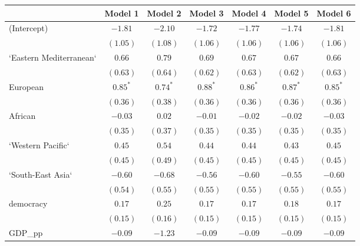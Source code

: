 
\begin{table}[!h]
\begin{center}
\begin{tabular}{l c c c c c c }
\toprule
 & Model 1 & Model 2 & Model 3 & Model 4 & Model 5 & Model 6 \\
\midrule
(Intercept)             & $-1.81$      & $-2.10$      & $-1.72$      & $-1.77$      & $-1.74$      & $-1.81$      \\
                        & $(1.05)$     & $(1.08)$     & $(1.06)$     & $(1.06)$     & $(1.06)$     & $(1.06)$     \\
`Eastern Mediterranean` & $0.66$       & $0.79$       & $0.69$       & $0.67$       & $0.67$       & $0.66$       \\
                        & $(0.63)$     & $(0.64)$     & $(0.62)$     & $(0.63)$     & $(0.62)$     & $(0.63)$     \\
European                & $0.85^{*}$   & $0.74^{*}$   & $0.88^{*}$   & $0.86^{*}$   & $0.87^{*}$   & $0.85^{*}$   \\
                        & $(0.36)$     & $(0.38)$     & $(0.36)$     & $(0.36)$     & $(0.36)$     & $(0.36)$     \\
African                 & $-0.03$      & $0.02$       & $-0.01$      & $-0.02$      & $-0.02$      & $-0.03$      \\
                        & $(0.35)$     & $(0.37)$     & $(0.35)$     & $(0.35)$     & $(0.35)$     & $(0.35)$     \\
`Western Pacific`       & $0.45$       & $0.54$       & $0.44$       & $0.44$       & $0.43$       & $0.45$       \\
                        & $(0.45)$     & $(0.49)$     & $(0.45)$     & $(0.45)$     & $(0.45)$     & $(0.45)$     \\
`South-East Asia`       & $-0.60$      & $-0.68$      & $-0.56$      & $-0.60$      & $-0.55$      & $-0.60$      \\
                        & $(0.54)$     & $(0.55)$     & $(0.55)$     & $(0.55)$     & $(0.55)$     & $(0.55)$     \\
democracy               & $0.17$       & $0.25$       & $0.17$       & $0.17$       & $0.18$       & $0.17$       \\
                        & $(0.15)$     & $(0.16)$     & $(0.15)$     & $(0.15)$     & $(0.15)$     & $(0.15)$     \\
GDP\_pp                 & $-0.09$      & $-1.23$      & $-0.09$      & $-0.09$      & $-0.09$      & $-0.09$      \\

\end{tabular}
\end{center}
\end{table}
